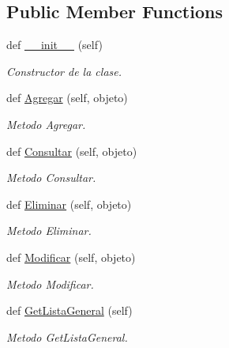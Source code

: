 \subsection*{Public Member Functions}
\begin{DoxyCompactItemize}
\item 
def \hyperlink{class_controller_1_1_gestor_general_1_1_gestor_general_ae863157e839c4210ed21da4d237e69ca}{\+\_\+\+\_\+init\+\_\+\+\_\+} (self)
\begin{DoxyCompactList}\small\item\em Constructor de la clase. \end{DoxyCompactList}\item 
def \hyperlink{class_controller_1_1_gestor_general_1_1_gestor_general_a9b620b3b9747d3f976c499d623bb975b}{Agregar} (self, objeto)
\begin{DoxyCompactList}\small\item\em Metodo Agregar. \end{DoxyCompactList}\item 
def \hyperlink{class_controller_1_1_gestor_general_1_1_gestor_general_a4a1ebb934efd98e4d1ffd065144c0427}{Consultar} (self, objeto)
\begin{DoxyCompactList}\small\item\em Metodo Consultar. \end{DoxyCompactList}\item 
def \hyperlink{class_controller_1_1_gestor_general_1_1_gestor_general_a15a6db0b2a80304807dbfb1b0ea5a8e7}{Eliminar} (self, objeto)
\begin{DoxyCompactList}\small\item\em Metodo Eliminar. \end{DoxyCompactList}\item 
def \hyperlink{class_controller_1_1_gestor_general_1_1_gestor_general_a61090b6b006fcc791c2fe55f251405e4}{Modificar} (self, objeto)
\begin{DoxyCompactList}\small\item\em Metodo Modificar. \end{DoxyCompactList}\item 
def \hyperlink{class_controller_1_1_gestor_general_1_1_gestor_general_af0302d39caf2be664abae8a96594c416}{Get\+Lista\+General} (self)
\begin{DoxyCompactList}\small\item\em Metodo Get\+Lista\+General. \end{DoxyCompactList}\end{DoxyCompactItemize}
